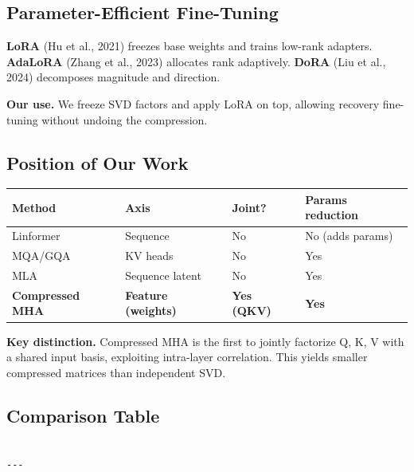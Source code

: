 \subsection{Parameter-Efficient Fine-Tuning}

\textbf{LoRA} (Hu et al., 2021) freezes base weights and trains low-rank adapters. 
\textbf{AdaLoRA} (Zhang et al., 2023) allocates rank adaptively. \textbf{DoRA} (Liu 
et al., 2024) decomposes magnitude and direction.

\textbf{Our use.} We freeze SVD factors and apply LoRA on top, allowing 
recovery fine-tuning without undoing the compression.

\subsection{Position of Our Work}

\begin{table}[H]
\centering
\small
\begin{tabular}{llll}
\toprule
\textbf{Method} & \textbf{Axis} & \textbf{Joint?} & \textbf{Params reduction} \\
\midrule
Linformer & Sequence & No & No (adds params) \\
MQA/GQA & KV heads & No & Yes \\
MLA & Sequence latent & No & Yes \\
\textbf{Compressed MHA} & \textbf{Feature (weights)} & \textbf{Yes (QKV)} & \textbf{Yes} \\
\bottomrule
\end{tabular}
\end{table}

\textbf{Key distinction.} Compressed MHA is the first to jointly factorize Q, K, V 
with a shared input basis, exploiting intra-layer correlation. This yields 
smaller compressed matrices than independent SVD.



\subsection{Comparison Table}

\begin{lstlisting}

---
\end{lstlisting}